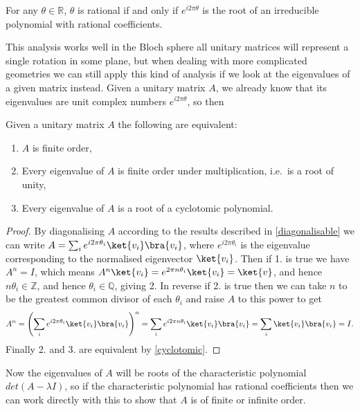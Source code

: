\begin{theorem}\label{cyclotomic} For any $\theta \in \mathbb{R}$, $\theta$ is rational if and only if $e^{i2\pi \theta}$ is the root of an irreducible polynomial with rational coefficients.
\end{theorem}

This analysis works well in the Bloch sphere all unitary matrices will represent a single rotation in some plane, but when dealing with more complicated geometries we can still apply this kind of analysis if we look at the eigenvalues of a given matrix instead. Given a unitary matrix $A$, we already know that its eigenvalues are unit complex numbers $e^{i 2\pi\theta}$, so then

\begin{prop}Given a unitary matrix $A$ the following are equivalent:
\begin{enumerate}
	\item $A$ is finite order,
	\item Every eigenvalue of $A$ is finite order under multiplication, i.e.\ is a root of unity,
	\item Every eigenvalue of $A$ is a root of a cyclotomic polynomial.
\end{enumerate}
\end{prop}
\begin{proof}
	By diagonalising $A$ according to the results described in \autoref{diagonalisable} we can write $A = \sum_i e^{i2\pi\theta_i}\ket{v_i}\bra{v_i}$, where $e^{i2\pi\theta_i}$ is the eigenvalue corresponding to the normalised eigenvector $\ket{v_i}$. Then if 1. is true we have $A^n = I$, which means $A^n\ket{v_i} = e^{2\pi n\theta_i}\ket{v_i} = \ket{v}$, and hence $n\theta_i \in \mathbb{Z}$, and hence $\theta_i \in \mathbb{Q}$, giving 2. In reverse if 2. is true then we can take $n$ to be the greatest common divisor of each $\theta_i$ and raise $A$ to this power to get
	\[A^n = \left(\sum_i e^{i2\pi\theta_i}\ket{v_i}\bra{v_i}\right)^n = \sum_i e^{i2\pi n \theta_i}\ket{v_i}\bra{v_i} = \sum_i \ket{v_i}\bra{v_i} = I.\]
	Finally 2. and 3. are equivalent by \autoref{cyclotomic}.
\end{proof}
Now the eigenvalues of $A$ will be roots of the characteristic polynomial $det(A - \lambda I)$, so if the characteristic polynomial has rational coefficients then we can work directly with this to show that $A$ is of finite or infinite order. 

